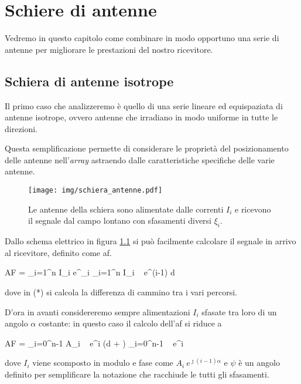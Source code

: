 \chapter{Schiere di antenne}

	Vedremo in questo capitolo come combinare in modo opportuno una serie di antenne per migliorare le prestazioni del nostro ricevitore.

\section{Schiera di antenne isotrope}
	Il primo caso che analizzeremo è quello di una serie lineare ed equispaziata di antenne isotrope, ovvero antenne che irradiano in modo uniforme in tutte le direzioni.

	Questa semplificazione permette di considerare le proprietà del posizionamento delle antenne nell'\emph{array} astraendo dalle caratteristiche specifiche delle varie antenne.

	\begin{figure}[ht]
		\centering
		\texttt{[image: img/schiera\_antenne.pdf]}
		\caption{Le antenne della schiera sono alimentate dalle correnti $I_i$ e ricevono il segnale dal campo lontano con sfasamenti diversi $\xi_i$.}
		\label{fig:schiera}
	\end{figure}

	Dallo schema elettrico in figura \ref{fig:schiera} si può facilmente calcolare il segnale in arrivo al ricevitore, definito come \gls{af}.

	\begin{esp} \label{eq:array_factor}
		AF = \sum_{i=1}^n I_i e^{\jmath \xi_i}
			\stackrel{(*)}{=} \sum_{i=1}^n I_i ~ e^{\jmath (i-1) \beta d \cos \theta}
	\end{esp}
	dove in (*) si calcola la differenza di cammino tra i vari percorsi.

	D'ora in avanti considereremo sempre alimentazioni $I_i$ sfasate tra loro di un angolo $\alpha$ costante: in questo caso il calcolo dell'\gls{af} si riduce a

	\begin{esp}
		AF = \sum_{i=0}^{n-1} A_i ~ e^{\jmath i (\beta d \cos \theta + \alpha)}
			 \sum_{i=0}^{n-1} ~ e^{\jmath i \psi}
	\end{esp}
	dove $I_i$ viene scomposto in modulo e fase come $A_i ~ e^{\jmath (i-1) \alpha}$ e $\psi$ è un angolo definito per semplificare la notazione che racchiude le tutti gli sfasamenti.
	
